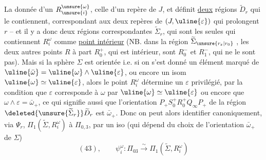 La donnée d'un $R_{\unsure{i}}^{\unsure{\omega}}$,  celle d'un repère  de $J$, et définit \uline{deux}  régions $\widetilde D_r$ qui le contiennent, correspondant aux deux repères de $(J,\uline{\varepsilon})$ qui prolongent $r$ -- et il y a donc deux régions correspondantes $\widetilde\Sigma_r$, qui sont les seules qui contiennent $R_i^\omega$ comme \uline{point intérieur} (NB. dans la région $\widetilde\Sigma_{\unsure{r_\varepsilon|r_0}}$ , les deux autres points $R$ à part $R_0^+$, qui est intérieur, sont $R_0^-$ et $R_1^-$, qui ne le sont pas). Mais si la sphère $\Sigma$ est orientée i.e. si on s'est donné un élément marqué \inserted{$\bar\omega_+$} de $\uline{\bar\omega}=\uline{\omega}\wedge\uline{\varepsilon}$, ou encore un isom $\uline{\omega}\simeq\uline{\varepsilon}$, alors le point $R_i^\omega$ détermine un $\varepsilon$ \inserted{$\in\uline{\varepsilon}$} privilégié, par la condition que $\varepsilon$ corresponde à $\omega$ par $\uline{\omega}\simeq\uline{\varepsilon}$ ou encore que $\omega\wedge\varepsilon=\bar\omega_+$, ce qui signifie aussi que l'orientation $P_+S_0^+R_0^+Q_\infty P_+$ de la région $\deleted{\unsure{\widetilde\Sigma_r}}\widetilde D_r$ est  $\bar\omega_+$. Donc on peut alors identifier canoniquement, via $\Psi_r$, $\Pi_1(\widetilde\Sigma,R_i^\omega)$ à $\Pi_{0,3}$, par un iso (qui dépend du choix de l'orientation $\bar\omega_+$ de $\Sigma$)
\[
(43),\qquad\psi_i^\omega:\Pi_{03}\xrightarrow{\sim}\Pi_1(\widetilde\Sigma,R_i^\omega)
\]
